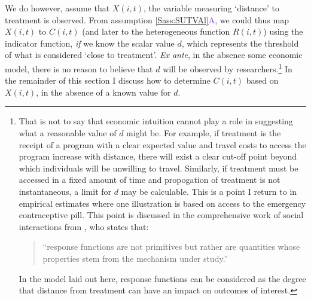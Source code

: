\documentclass[12pt]{article}
\newcommand{\asref}[2]{\ref{#1}{\textcolor{BlueViolet}{#2}}}
\begin{document}
\begin{spacing}{1.3}
We do however, assume that $X(i,t)$, the variable measuring `distance' to 
treatment is observed. From assumption \asref{Sass:SUTVAl}{A}, we could thus map 
$X(i,t)$ to $C(i,t)$ (and later to the heterogeneous function $R(i,t)$) using the 
indicator function, \emph{if} we know the scalar value $d$, which represents the 
threshold of what is considered `close to treatment'. \emph{Ex ante}, in the 
absence some economic model, there is no reason to believe that $d$ will be 
observed by researchers.\footnote{That is not to say that economic intuition 
cannot play a role in suggesting what a reasonable value of $d$ might be. For 
example, if treatment is the receipt of a program with a clear expected value and 
travel costs to access the program increase with distance, there will exist a 
clear cut-off point beyond which individuals will be unwilling to travel. 
Similarly, if treatment must be accessed in a fixed amount of time and 
propogation of treatment is not instantaneous, a limit for $d$ may be calculable. 
This is a point I return to in empirical estimates where one illustration is 
based on access to the emergency contraceptive pill. This point is discussed
in the comprehensive work of social interactions from \citet{Manski2013},
who states that:
  \begin{quote}
    ``response functions are not primitives but rather are
    quantities whose properties stem from the mechanism under study.''
    \citep[p.\ S14]{Manski2013}
  \end{quote}
  In the model laid out here, response functions can be considered as the degree
  that distance from treatment can have an impact on outcomes of interest.
}
In the remainder of this 
section I discuss how to determine $C(i,t)$ based on $X(i,t)$, in the absence of 
a known value for $d$.


\end{spacing}
\end{document}
